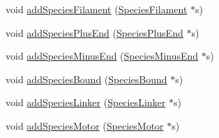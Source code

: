 {\bf }\par
\begin{DoxyCompactItemize}
\item 
void \hyperlink{classCMonomer_a3cdb15e3d7f2143217ad3b002337e8b1}{add\+Species\+Filament} (\hyperlink{classSpeciesFilament}{Species\+Filament} $\ast$s)
\item 
void \hyperlink{classCMonomer_a3c2a4890f5a040cdf19a150030db434c}{add\+Species\+Plus\+End} (\hyperlink{classSpeciesPlusEnd}{Species\+Plus\+End} $\ast$s)
\item 
void \hyperlink{classCMonomer_ace655af18907f289683d00f6e7597b71}{add\+Species\+Minus\+End} (\hyperlink{classSpeciesMinusEnd}{Species\+Minus\+End} $\ast$s)
\item 
void \hyperlink{classCMonomer_a64f136517ed2ff2d15aaa5c9bd4d9153}{add\+Species\+Bound} (\hyperlink{classSpeciesBound}{Species\+Bound} $\ast$s)
\item 
void \hyperlink{classCMonomer_a06bfb6c661455b50d8f125cec4a06485}{add\+Species\+Linker} (\hyperlink{classSpeciesLinker}{Species\+Linker} $\ast$s)
\item 
void \hyperlink{classCMonomer_a57b8bf84368ddc0f8bfafaeaec508132}{add\+Species\+Motor} (\hyperlink{classSpeciesMotor}{Species\+Motor} $\ast$s)
\end{DoxyCompactItemize}

